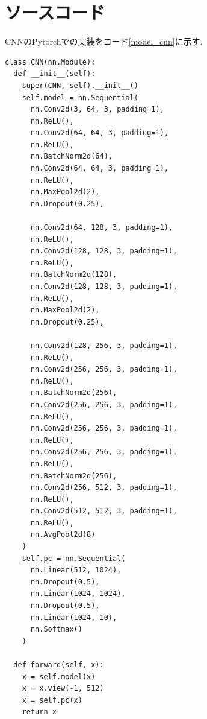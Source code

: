 \documentclass[twocolumn]{jarticle}     %
\begin{document}
\section{ソースコード}

CNNのPytorchでの実装をコード\ref{model_cnn}に示す.

\begin{lstlisting}[caption=cnn,label=model_cnn]
class CNN(nn.Module):
  def __init__(self):
    super(CNN, self).__init__()
    self.model = nn.Sequential(
      nn.Conv2d(3, 64, 3, padding=1),
      nn.ReLU(),
      nn.Conv2d(64, 64, 3, padding=1),
      nn.ReLU(),
      nn.BatchNorm2d(64),
      nn.Conv2d(64, 64, 3, padding=1),
      nn.ReLU(),
      nn.MaxPool2d(2),
      nn.Dropout(0.25),

      nn.Conv2d(64, 128, 3, padding=1),
      nn.ReLU(),
      nn.Conv2d(128, 128, 3, padding=1),
      nn.ReLU(),
      nn.BatchNorm2d(128),
      nn.Conv2d(128, 128, 3, padding=1),
      nn.ReLU(),
      nn.MaxPool2d(2),
      nn.Dropout(0.25),

      nn.Conv2d(128, 256, 3, padding=1),
      nn.ReLU(),
      nn.Conv2d(256, 256, 3, padding=1),
      nn.ReLU(),
      nn.BatchNorm2d(256),
      nn.Conv2d(256, 256, 3, padding=1),
      nn.ReLU(),
      nn.Conv2d(256, 256, 3, padding=1),
      nn.ReLU(),
      nn.Conv2d(256, 256, 3, padding=1),
      nn.ReLU(),
      nn.BatchNorm2d(256),
      nn.Conv2d(256, 512, 3, padding=1),
      nn.ReLU(),
      nn.Conv2d(512, 512, 3, padding=1),
      nn.ReLU(),
      nn.AvgPool2d(8)
    )
    self.pc = nn.Sequential(
      nn.Linear(512, 1024),
      nn.Dropout(0.5),
      nn.Linear(1024, 1024),
      nn.Dropout(0.5),
      nn.Linear(1024, 10),
      nn.Softmax()
    )

  def forward(self, x):
    x = self.model(x)
    x = x.view(-1, 512)
    x = self.pc(x)
    return x
\end{lstlisting}


	
	
\end{document}
